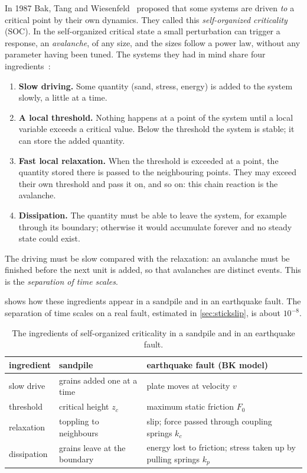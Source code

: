 In 1987 Bak, Tang and Wiesenfeld~\cite{BTW1987,BTW1988} proposed that some systems are driven \emph{to} a
critical point by their own dynamics. They called this \emph{self-organized criticality} (SOC). In the
self-organized critical state a small perturbation can trigger a response, an \emph{avalanche}, of any size, and
the sizes follow a power law, without any parameter having been tuned. The systems they had in mind share four
ingredients~\cite{Jensen1998,Charbonneau2017}:
\begin{enumerate}
  \item \textbf{Slow driving.} Some quantity (sand, stress, energy) is added to the system slowly, a little at a
    time.
  \item \textbf{A local threshold.} Nothing happens at a point of the system until a local variable exceeds a
    critical value. Below the threshold the system is stable; it can store the added quantity.
  \item \textbf{Fast local relaxation.} When the threshold is exceeded at a point, the quantity stored there is
    passed to the neighbouring points. They may exceed their own threshold and pass it on, and so on: this
    chain reaction is the avalanche.
  \item \textbf{Dissipation.} The quantity must be able to leave the system, for example through its boundary;
    otherwise it would accumulate forever and no steady state could exist.
\end{enumerate}
The driving must be slow compared with the relaxation: an avalanche must be finished before the next unit is
added, so that avalanches are distinct events. This is the \emph{separation of time scales}.

 shows how these ingredients appear in a sandpile and in an earthquake fault. The
separation of time scales on a real fault, estimated in \cref{sec:stickslip}, is about $10^{-8}$.

\begin{table}[t]
\centering
\caption{The ingredients of self-organized criticality in a sandpile and in an earthquake fault.}
\label{tab:soc-analogy}
\begin{tabular}{@{}p{22mm}p{50mm}p{70mm}@{}}
\toprule
ingredient & sandpile & earthquake fault (BK model) \\
\midrule
slow drive & grains added one at a time & plate moves at velocity $v$ \\
threshold & critical height $z_c$ & maximum static friction $F_0$ \\
relaxation & toppling to neighbours & slip; force passed through coupling springs $k_c$ \\
dissipation & grains leave at the boundary & energy lost to friction; stress taken up by pulling springs $k_p$ \\
\bottomrule
\end{tabular}
\end{table}

